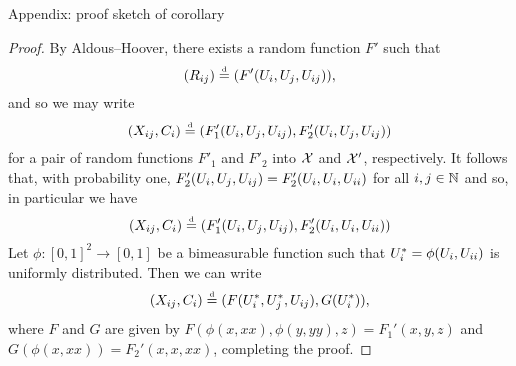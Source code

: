 \begin{frame}{Appendix: proof sketch of corollary}
\begin{proof}
By Aldous--Hoover, there exists a random function $F'$ such that
\[
(R_{ij}) \stackrel{\mbox{\tiny d}}{=} (F'(U_i,U_j,U_{ij})), \nonumber
\]
and so we may write 
\[
(X_{ij}, C_i) \stackrel{\mbox{\tiny d}}{=} 
     (F_1'(U_i,U_j,U_{ij}), F_2'(U_i,U_j,U_{ij})) \nonumber
\]
for a pair of random functions $F'_1$ and $F'_2$ into $\mathcal{X}$ and $\mathcal{X}'$, respectively.
It follows that, with probability one,
$F_2'(U_i,U_j,U_{ij}) = F_2'(U_i,U_i,U_{ii})$ for all $i,j\in\mathbb{N}$
and so, in particular we have 
\[
(X_{ij}, C_i) \stackrel{\mbox{\tiny d}}{=} 
       (F_1'(U_i,U_j,U_{ij}),F_2'(U_i,U_i,U_{ii})) \nonumber
\]
Let $\phi: [0,1]^2 \to [0,1]$ be a bimeasurable function such that
$U_i^* = \phi(U_i,U_{ii})$ is uniformly distributed.
Then we can write
\[
(X_{ij}, C_i) \stackrel{\mbox{\tiny d}}{=} (F(U_i^*,U_j^*,U_{ij}), G(U_i^*)), \nonumber
\]
where $F$ and $G$ are given by $F(\phi(x,xx),\phi(y,yy),z) = F_1'(x,y,z)$ and $G(\phi(x,xx)) = F_2'(x,x,xx)$, completing the proof.
\end{proof}
\end{frame}





